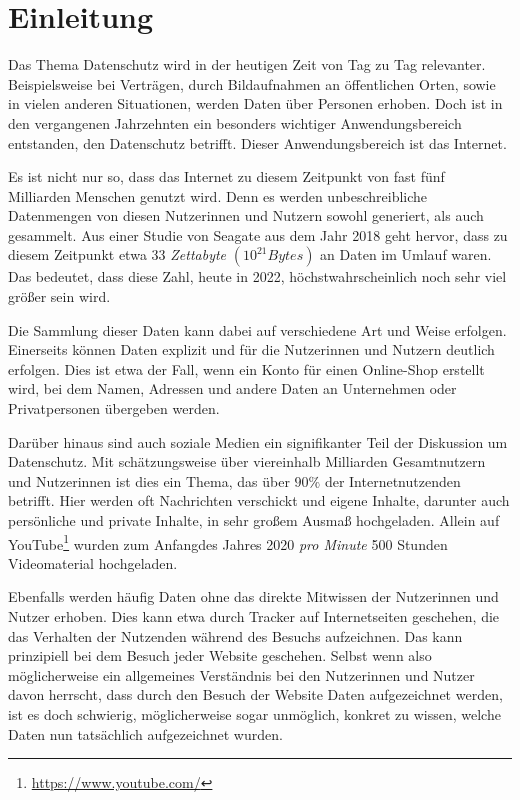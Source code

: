 \section{Einleitung}

Das Thema Datenschutz wird in der heutigen Zeit von Tag zu Tag relevanter.
Beispielsweise bei Verträgen, durch Bildaufnahmen an öffentlichen Orten, sowie in vielen anderen 
Situationen, werden Daten über Personen erhoben.
Doch ist in den vergangenen Jahrzehnten ein besonders wichtiger Anwendungsbereich entstanden, den Datenschutz betrifft.
Dieser Anwendungsbereich ist das Internet.

Es ist nicht nur so, dass das Internet zu diesem Zeitpunkt von fast fünf Milliarden Menschen genutzt wird. \cite{kemp_digital_2022}
Denn es werden unbeschreibliche Datenmengen von diesen Nutzerinnen und Nutzern sowohl generiert, als auch gesammelt. 
Aus einer Studie von Seagate aus dem Jahr 2018 geht hervor, dass zu diesem Zeitpunkt etwa 33 \emph{Zettabyte} $(10^{21} Bytes)$ an Daten im Umlauf waren. \cite{reinsel_digitization_2018}
Das bedeutet, dass diese Zahl, heute in 2022, höchstwahrscheinlich noch sehr viel größer sein wird.

Die Sammlung dieser Daten kann dabei auf verschiedene Art und Weise erfolgen.
Einerseits können Daten explizit und für die Nutzerinnen und Nutzern deutlich erfolgen. 
Dies ist etwa der Fall, wenn ein Konto für einen Online-Shop erstellt wird, bei dem Namen, Adressen und andere Daten an Unternehmen oder Privatpersonen übergeben werden. 

Darüber hinaus sind auch soziale Medien ein signifikanter Teil der Diskussion um Datenschutz.
Mit schätzungsweise über viereinhalb Milliarden Gesamtnutzern und Nutzerinnen \cite{kemp_digital_2022} ist dies ein Thema, das über $90\%$ der Internetnutzenden betrifft.  
Hier werden oft Nachrichten verschickt und eigene Inhalte, darunter auch persönliche und private Inhalte, in sehr großem Ausmaß hochgeladen. Allein auf YouTube\footnote{\url{https://www.youtube.com/}} wurden zum Anfangdes Jahres 2020 \emph{pro Minute} 500 Stunden Videomaterial hochgeladen. \cite{wojcicki_youtube_2020}

Ebenfalls werden häufig Daten ohne das direkte Mitwissen der Nutzerinnen und Nutzer erhoben.
Dies kann etwa durch Tracker auf Internetseiten geschehen, die das Verhalten der Nutzenden während des Besuchs aufzeichnen. 
Das kann prinzipiell bei dem Besuch jeder Website geschehen. 
Selbst wenn also möglicherweise ein allgemeines Verständnis bei den Nutzerinnen und Nutzer davon herrscht, dass durch den Besuch der Website Daten aufgezeichnet werden, 
ist es doch schwierig, möglicherweise sogar unmöglich, konkret zu wissen, welche Daten nun tatsächlich aufgezeichnet wurden.

